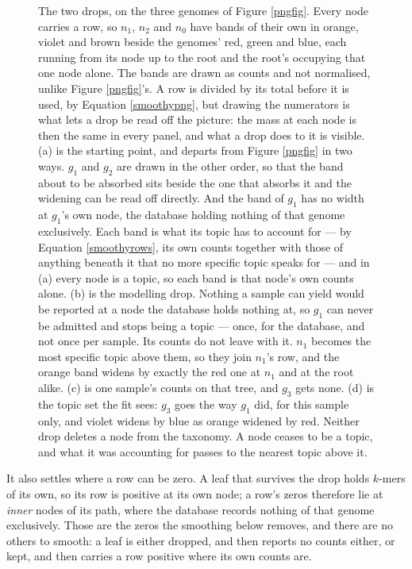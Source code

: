 \documentclass[pdflatex,sn-vancouver-num]{sn-jnl}
\begin{document}
\begin{figure}[!htbp]
        \caption{The two drops, on the three genomes of Figure \ref{pngfig}. Every node carries a
        row, so $n_1$, $n_2$ and $n_0$ have bands of their own in orange, violet and
        brown beside the genomes' red, green and blue, each running from its node up to the root and
        the root's occupying that one node alone. The bands are drawn as counts and not normalised,
        unlike Figure \ref{pngfig}'s. A row is divided by its total before it is used, by
        Equation \eqref{smoothypng}, but drawing the numerators is what lets a drop be read off the
        picture: the mass at each node is then the same in every panel, and what a drop does to it is
        visible. (a) is the starting point, and departs from Figure \ref{pngfig} in two ways. $g_1$
        and $g_2$ are drawn in the other order, so that the band about to be absorbed sits beside the
        one that absorbs it and the widening can be read off directly. And the band of
        $g_1$ has no width at $g_1$'s own node, the database holding nothing of that genome
        exclusively. Each band is what its topic has to account for --- by
        Equation \eqref{smoothyrows}, its own counts together with those of anything beneath it that
        no more specific topic speaks for --- and in (a) every node is a topic, so each band is that
        node's own counts alone. (b) is the modelling drop. Nothing a sample can yield would be
        reported at a node the database holds nothing at, so $g_1$ can never be admitted and stops
        being a topic --- once, for the database, and not once per sample. Its counts do not leave
        with it. $n_1$ becomes the most specific topic above them, so they join $n_1$'s row, and the
        orange band widens by exactly the red one at $n_1$ and at the root alike. (c) is one sample's
        counts on that tree, and $g_3$ gets none. (d) is the topic set the fit sees: $g_3$ goes the
        way $g_1$ did, for this sample only, and violet widens by blue as orange widened by red.
        Neither drop deletes a node from the taxonomy. A node ceases to be a topic, and what it was
        accounting for passes to the nearest topic above it.}\label{dropfig}
    \end{figure}

    It also settles where a row can be zero. A leaf that survives the drop holds $k$-mers of its own,
    so its row is positive at its own node; a row's zeros therefore lie at \emph{inner} nodes of its
    path, where the database records nothing of that genome exclusively. Those are the zeros the
    smoothing below removes, and there are no others to smooth: a leaf is either dropped, and then
    reports no counts either, or kept, and then carries a row positive where its own counts are.
\end{document}
